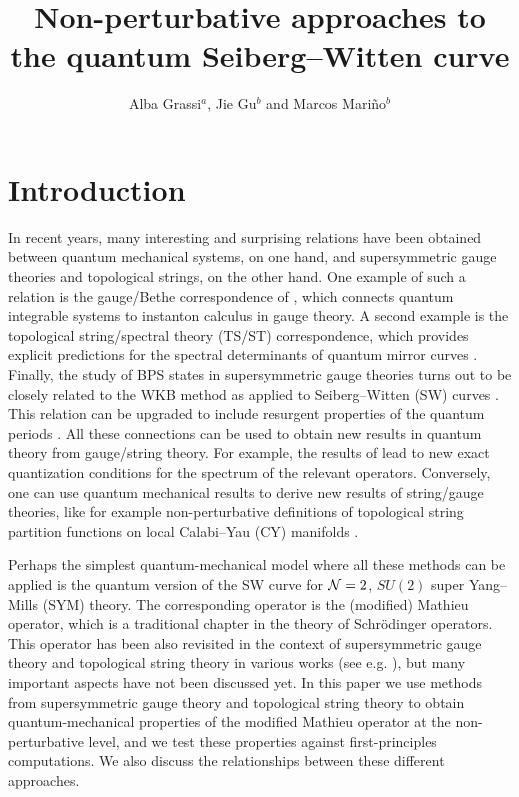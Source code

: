 \documentclass[a4paper,11pt]{article}
\title{\huge{Non-perturbative approaches to the quantum Seiberg--Witten curve}}
\author{Alba Grassi$^a$, Jie Gu$^b$ and Marcos Mari\~no$^b$}
\affiliation{
$^a$Simons Center for Geometry and Physics,\\
 SUNY, Stony Brook, NY, 1194-3636, USA \\
 \\
 $^b$ D\'epartement de Physique Th\'eorique et Section de Math\'ematiques,\\
Universit\'e de Gen\`eve, Gen\`eve, CH-1211 Switzerland}
\theoremstyle{definition}
\begin{document}
\maketitle

\flushbottom


\section{Introduction}

In recent years, many interesting and surprising relations have been
obtained between quantum mechanical systems, on one hand, and
supersymmetric gauge theories and topological strings, on the other
hand. One example of such a relation is the gauge/Bethe correspondence
of \cite{ns}, which connects quantum integrable systems to instanton
calculus in gauge theory. A second example is the 
topological string/spectral theory (TS/ST) correspondence, which
provides explicit predictions for the spectral determinants of quantum
mirror curves \cite{ghm,cgm,mmrev}. Finally, the study of BPS states
in supersymmetric gauge theories turns out to be closely related to
the WKB method as applied to Seiberg--Witten (SW) curves
\cite{gmn,gmn2,oper}. This relation can be upgraded to include
resurgent properties of the quantum periods \cite{ims, mm-s2019}.  All
these connections can be used to obtain new results in quantum theory
from gauge/string theory. For example, the results of \cite{ns,ghm}
lead to new exact quantization conditions for the spectrum of the
relevant operators. Conversely, one can use quantum mechanical results
to derive new results of string/gauge theories, like for example
non-perturbative definitions of topological string partition functions
on local Calabi--Yau (CY) manifolds \cite{ghm,cgm,mz}.

Perhaps the simplest quantum-mechanical model where all these methods
can be applied is the quantum version of the SW curve for
${\cal N}=2$, $SU(2)$ super Yang--Mills (SYM) theory.  The
corresponding operator is the (modified) Mathieu operator, which is a
traditional chapter in the theory of Schr\"odinger operators. This
operator has been also revisited in the context of supersymmetric
gauge theory and topological string theory in various works (see
e.g. \cite{mirmor,he-miao,huangNS,basar-dunne,kpt,ashok,coms}), but
many important aspects have not been discussed yet.  In this paper we
use methods from supersymmetric gauge theory and topological string
theory to obtain quantum-mechanical properties of the modified Mathieu
operator at the non-perturbative level, and we test these properties
against first-principles computations. We also discuss the
relationships between these different approaches.
\end{document}
